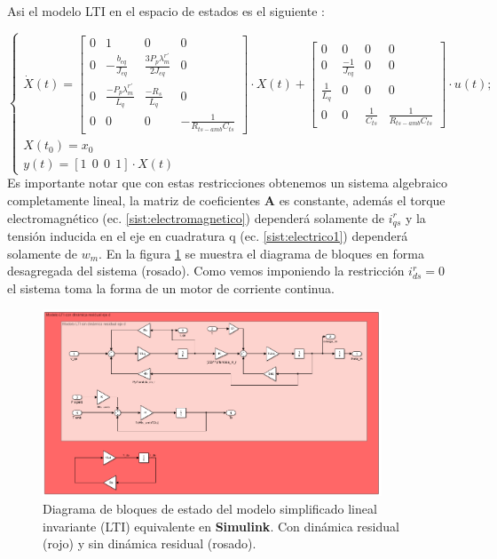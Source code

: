 \documentclass[10pt]{article}
\begin{document}
\begin{enumerate}
\begin{itemize}
	Asi el modelo LTI en el espacio de estados es el siguiente  :
	
	\begin{equation}
	\begin{cases}
	\dot{X}(t)=\begin{bmatrix}
	0 & 1 &0 &0\\ 
	0 & -\frac{b_{eq}}{J_{eq}} & \frac{3 P_{p} \lambda^{r'}_{m}}{2 J_{eq}} & 0\\ 
	0  & \frac{- P_{p} \lambda^{r'}_{m}}{ L_{q}} & \frac{-R_{s}}{L_{q}} & 0\\
	0 & 0 & 0 & -\frac{1}{R_{ts-amb} C_{ts}}
	\end{bmatrix}\cdot X(t) + \begin{bmatrix}
	0 &0 &0 &0\\ 
	0 &\frac{-1}{J_{eq}} &0 &0\\ 
	 \frac{1}{L_{q}}&0 &0 & 0\\
	0 & 0 & \frac{1}{C_{ts}} & \frac{1}{R_{ts-amb} C_{ts}}
	\end{bmatrix} 
	\cdot u(t); \\
	X(t_{0})=x_{0}\\ 
	y(t)=[1 \ \ 0 \ \ 0 \ \ 1] \cdot X(t)
	\end{cases}
	\label{eq:2.1.2.c.4}
	\end{equation}
	Es importante notar que con estas restricciones obtenemos un sistema algebraico completamente lineal, la matriz de coeficientes \textbf{A} es constante, además el torque electromagnético (ec. \ref{sist:electromagnetico}) dependerá solamente de $i^{r}_{qs}$ y la tensión inducida en el eje en cuadratura q (ec. \ref{sist:electrico1}) dependerá solamente de $w_{m}$.
	En la figura \ref{fig:diagLTI} se muestra el diagrama de bloques en forma desagregada del sistema (rosado). Como vemos imponiendo la restricción $i^{r}_{ds}=0$ el sistema toma la forma de un motor de corriente continua.
	\begin{figure}[h!]
		\centering
		\includegraphics[width=0.9\textwidth]{DiagramabloquesLTI.png}
		\caption{\label{fig:diagLTI} Diagrama de bloques de estado del modelo simplificado lineal invariante (LTI) equivalente en \textbf{Simulink}. Con dinámica residual (rojo) y sin dinámica residual (rosado). }
	\end{figure}


\end{itemize}
\end{enumerate}
\end{document}
